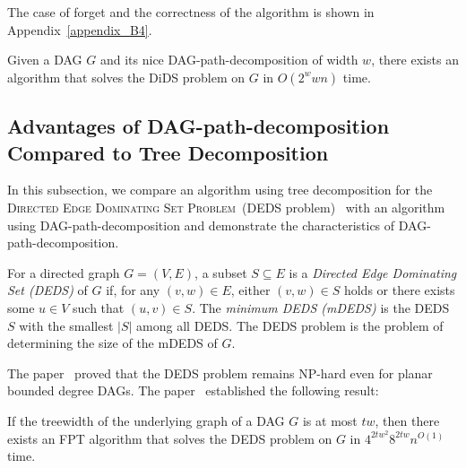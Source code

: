\documentclass[runningheads]{llncs}
\theoremstyle{plain}
\theoremstyle{definition}
\begin{document}
The case of forget and the correctness of the algorithm is shown in Appendix~\ref{appendix_B4}.

\begin{theorem}\label{theorem_dids}
    Given a DAG \(G\) and its nice DAG-path-decomposition of width \(w\), there exists an algorithm that solves the DiDS problem on \(G\) in \(O(2^w w n)\) time.  
\end{theorem}


\subsection{Advantages of DAG-path-decomposition Compared to Tree Decomposition}\label{sec:comp}



In this subsection, we compare an algorithm using tree decomposition for the \textsc{Directed Edge Dominating Set Problem}~(DEDS problem)~\cite{art22} with an algorithm using DAG-path-decomposition and demonstrate the characteristics of DAG-path-decomposition.  

For a directed graph \(G = (V, E)\), a subset \(S \subseteq E\) is a \emph{Directed Edge Dominating Set (DEDS)} of \(G\) if, for any \((v, w) \in E\), either \((v, w) \in S\) holds or there exists some \(u \in V\) such that \((u, v) \in S\).  
The \emph{minimum DEDS (mDEDS)} is the DEDS \(S\) with the smallest \(|S|\) among all DEDS.  
The DEDS problem is the problem of determining the size of the mDEDS of \(G\).  

The paper~\cite{art23} proved that the DEDS problem remains NP-hard even for planar bounded degree DAGs. The paper~\cite{art22} established the following result:


\begin{proposition}
    If the treewidth of the underlying graph of a DAG \(G\) is at most \(tw\), then there exists an FPT algorithm that solves the DEDS problem on \(G\) in \(4^{2tw^2} 8^{2tw} n^{O(1)}\) time.  
\end{proposition}
\end{document}
